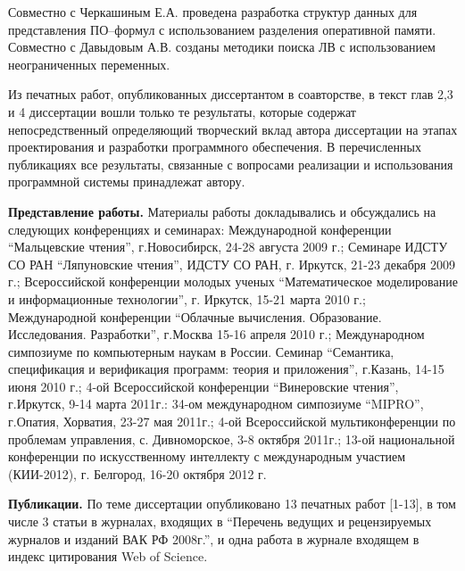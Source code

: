 \documentclass[a4paper]{report}
\begin{document}
Совместно с Черкашиным Е.А. проведена разработка структур данных для представления ПО--формул с использованием разделения оперативной памяти. Совместно с Давыдовым А.В. созданы методики поиска ЛВ с использованием неограниченных переменных.

Из печатных работ, опубликованных диссертантом в соавторстве, в текст глав 2,3 и 4 диссертации вошли только те результаты, которые содержат непосредственный определяющий творческий вклад автора диссертации на этапах проектирования и разработки программного обеспечения. В перечисленных публикациях все результаты, связанные с вопросами реализации и использования программной системы принадлежат автору.



\textbf{Представление работы.}
Материалы работы докладывались и обсуждались на следующих конференциях и семинарах:
Международной конференции ``Мальцевские чтения'', г.Новосибирск, 24-28 августа 2009 г.;
Семинаре ИДСТУ СО РАН ``Ляпуновские чтения'', ИДСТУ СО РАН, г. Иркутск, 21-23 декабря 2009 г.;
Всероссийской конференции молодых ученых ``Математическое моделирование и информационные технологии'', г. Иркутск, 15-21 марта 2010 г.;
Международной конференции ``Облачные вычисления. Образование. Исследования. Разработки'', г.Москва 15-16 апреля 2010 г.;
Международном симпозиуме по компьютерным наукам в России. Семинар ``Семантика, спецификация и верификация программ: теория и приложения'', г.Казань, 14-15 июня 2010 г.;
4-ой Всероссийской конференции ``Винеровские чтения'', г.Иркутск, 9-14 марта 2011г.:
34-ом международном симпозиуме ``MIPRO'', г.Опатия, Хорватия, 23-27 мая 2011г.;
4-ой Всероссийской мультиконференции по проблемам управления, с. Дивноморское, 3-8 октября 2011г.;
13-ой национальной конференции по искусственному интеллекту с международным участием (КИИ-2012), г. Белгород, 16-20 октября 2012 г.



\textbf{Публикации.} По теме диссертации опубликовано 13 печатных работ [1-13], в том числе 3 статьи в журналах, входящих в ``Перечень ведущих и рецензируемых журналов и изданий ВАК РФ 2008г.'', и одна работа в журнале входящем в индекс цитирования Web of Science.




\end{document}
